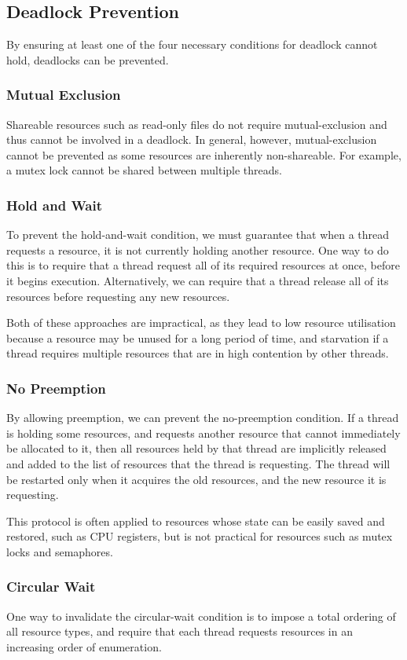 \documentclass{article}
\begin{document}
\subsection{Deadlock Prevention}
By ensuring at least one of the four necessary conditions for deadlock
cannot hold, deadlocks can be prevented.
\subsubsection{Mutual Exclusion}
Shareable resources such as read-only files do not require
mutual-exclusion and thus cannot be involved in a deadlock. In general,
however, mutual-exclusion cannot be prevented as some resources are
inherently non-shareable. For example, a mutex lock cannot be shared
between multiple threads.
\subsubsection{Hold and Wait}
To prevent the hold-and-wait condition, we must guarantee that when a
thread requests a resource, it is not currently holding another
resource. One way to do this is to require that a thread request all of
its required resources at once, before it begins execution.
Alternatively, we can require that a thread release all of its
resources before requesting any new resources.

Both of these approaches are impractical, as they lead to low resource
utilisation because a resource may be unused for a long period of time,
and starvation if a thread requires multiple resources that are in high
contention by other threads.
\subsubsection{No Preemption}
By allowing preemption, we can prevent the no-preemption condition. If
a thread is holding some resources, and requests another resource that
cannot immediately be allocated to it, then all resources held by that
thread are implicitly released and added to the list of resources that
the thread is requesting. The thread will be restarted only when it
acquires the old resources, and the new resource it is requesting.

This protocol is often applied to resources whose state can be easily
saved and restored, such as CPU registers, but is not practical for
resources such as mutex locks and semaphores.
\subsubsection{Circular Wait}
One way to invalidate the circular-wait condition is to impose a total
ordering of all resource types, and require that each thread requests
resources in an increasing order of enumeration.
\end{document}
